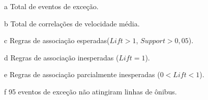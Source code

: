 \documentclass[
	12pt,				%
	oneside,			%
	a4paper,			%
	english,			%
	brazil				%
	]{abntex2ppgsi}
\begin{document}
{{\begin{apendicesenv}
\begin{table}[!htb]
\begin{threeparttable}
\begin{tablenotes}
            \item[a] Total de eventos de exceção.
            \item[b] Total de correlações de velocidade média.
            \item[c] Regras de associação esperadas($Lift > 1$, $Support > 0,05$).
            \item[d] Regras de associação inesperadas ($Lift = 1$).
            \item[e] Regras de associação parcialmente inesperadas ($0 < Lift < 1$).
            \item[f] 95 eventos de exceção não atingiram linhas de ônibus.
        \end{tablenotes}
\end{threeparttable}
\end{table}



\end{apendicesenv}}}
\end{document}
